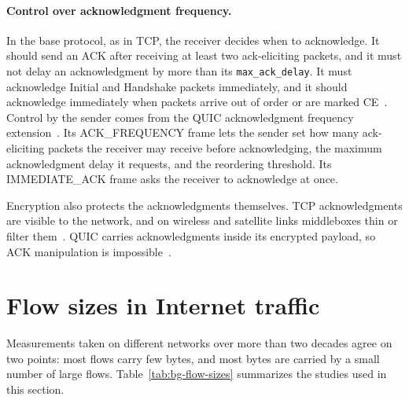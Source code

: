 \paragraph{Control over acknowledgment frequency.} In the base protocol, as in TCP,
the receiver decides when to acknowledge. It should send an ACK after receiving at
least two ack-eliciting packets, and it must not delay an acknowledgment by more than
its \texttt{max\_ack\_delay}. It must acknowledge Initial and Handshake packets
immediately, and it should acknowledge immediately when packets arrive out of order or
are marked CE~\cite{rfc9000}. Control by the sender comes from the QUIC
acknowledgment frequency extension~\cite{iyengar2026ackfrequency}. Its
ACK\_FREQUENCY frame lets the sender set how many ack-eliciting packets the receiver
may receive before acknowledging, the maximum acknowledgment delay it requests, and
the reordering threshold. Its IMMEDIATE\_ACK frame asks the receiver to acknowledge
at once.

Encryption also protects the acknowledgments themselves. TCP acknowledgments are
visible to the network, and on wireless and satellite links middleboxes thin or
filter them~\cite{custura2023reducing}. QUIC carries acknowledgments inside its
encrypted payload, so ACK manipulation is impossible~\cite{rfc9312}. 

\section{Flow sizes in Internet traffic}\label{sec:bg-traffic}

Measurements taken on different networks over more than two decades agree on two
points: most flows carry few bytes, and most bytes are carried by a small number of
large flows. Table~\ref{tab:bg-flow-sizes} summarizes the studies used in this
section.

